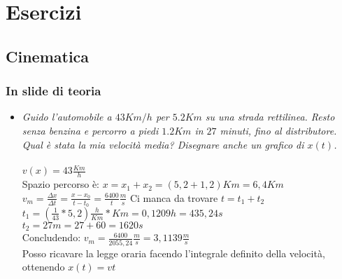 \documentclass[a4paper,12pt]{report}
\begin{document}
	\chapter{Esercizi}
	\section{Cinematica}
	\subsection{In slide di teoria}
	\begin{itemize}
		\item \textit{Guido l’automobile a $43 Km/h$ per $5.2 Km$ su una strada rettilinea. Resto senza benzina e 
			percorro a piedi $1.2 Km$ in $27$ minuti, fino al distributore. Qual è stata la mia velocità media? 
			Disegnare anche un grafico di $x(t)$.}\\\\
			$v(x) = 43 \frac{Km}{h}$\\
			Spazio percorso è: $x = x_1 + x_2 = (5,2 + 1,2)Km = 6,4Km$\\
			$v_m = \frac{\Delta x}{\Delta t} = \frac{x- x_0}{t - t_0} = \frac{6400}{t}\frac{m}{s}$ Ci manca da trovare $t = t_1 + t_2$\\
			$t_1 = (\frac{1}{43} * 5,2)\frac{h}{Km} * Km = 0,1209h = 435,24s$\\
			$t_2 = 27m = 27 + 60 = 1620s$\\
			Concludendo: $v_m = \frac{6400}{2055,24}\frac{m}{s} = 3,1139\frac{m}{s}$\\
			Posso ricavare la legge oraria facendo l'integrale definito della velocità, ottenendo $x(t) = vt$
	\end{itemize}
	
\end{document}
